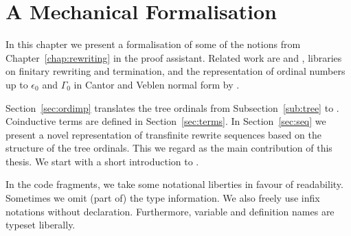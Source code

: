 \chapter{A Mechanical Formalisation}\label{chap:implementation}

In this chapter we present a formalisation of some of the notions from
Chapter~\ref{chap:rewriting} in the \Coq proof assistant. Related work
are \CoLoR \citep{blanqui-koprowski-10} and \Coccinelle
\citep{contejean-07}, libraries on finitary rewriting and termination,
and the representation of ordinal numbers up to $\epsilon_0$ and
$\Gamma_0$ in Cantor and Veblen normal form by \citet{casteran-06}.



Section~\ref{sec:ordimp} translates the
tree ordinals from Subsection~\ref{sub:tree} to \Coq. Coinductive
terms are defined in Section~\ref{sec:terms}. In Section~\ref{sec:seq}
we present a novel representation of transfinite rewrite sequences
based on the structure of the tree ordinals. This we regard as the main
contribution of this thesis. We start with a short
introduction to \Coq. %

In the \Coq code fragments, we take some notational liberties in favour
of readability. Sometimes we omit (part of) the type information. We
also freely use infix notations without declaration. Furthermore,
variable and definition names are typeset liberally.

